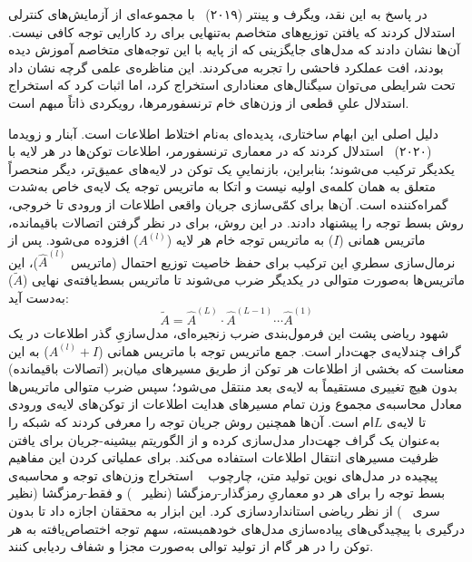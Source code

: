 در پاسخ به این نقد، ویگرف و پینتر (۲۰۱۹)~\cite{wiegreffe2019attention} با مجموعه‌ای از آزمایش‌های کنترلی استدلال کردند که یافتن توزیع‌های متخاصم به‌تنهایی برای رد کارایی توجه کافی نیست. آن‌ها نشان دادند که مدل‌های جایگزینی که از پایه با این توجه‌های متخاصم آموزش دیده بودند، افت عملکرد فاحشی را تجربه می‌کردند. این مناظره‌ی علمی گرچه نشان داد تحت شرایطی می‌توان سیگنال‌های معناداری استخراج کرد، اما اثبات کرد که استخراج استدلال علیِ قطعی از وزن‌های خام ترنسفورمرها، رویکردی ذاتاً مبهم است.

دلیل اصلی این ابهام ساختاری، پدیده‌ای به‌نام اختلاط اطلاعات است. آبنار و زویدما (۲۰۲۰)~\cite{abnar2020quantifying} استدلال کردند که در معماری ترنسفورمر، اطلاعات توکن‌ها در هر لایه با یکدیگر ترکیب می‌شوند؛ بنابراین، بازنماییِ یک توکن در لایه‌های عمیق‌تر، دیگر منحصراً متعلق به همان کلمه‌ی اولیه نیست و اتکا به ماتریس توجه یک لایه‌ی خاص به‌شدت گمراه‌کننده است. آن‌ها برای کمّی‌سازی جریان واقعی اطلاعات از ورودی تا خروجی، روش بسط توجه را پیشنهاد دادند. در این روش، برای در نظر گرفتن اتصالات باقیمانده، ماتریس همانی ($I$) به ماتریس توجه خام هر لایه ($A^{(l)}$) افزوده می‌شود. پس از نرمال‌سازی سطریِ این ترکیب برای حفظ خاصیت توزیع احتمال (ماتریس $\hat{A}^{(l)}$)، این ماتریس‌ها به‌صورت متوالی در یکدیگر ضرب می‌شوند تا ماتریس بسط‌یافته‌ی نهایی ($\tilde{A}$) به‌دست آید:
\begin{equation}\label{eq:chap3_attention_rollout}
    \tilde{A} = \hat{A}^{(L)} \cdot \hat{A}^{(L-1)} \cdots \hat{A}^{(1)}
\end{equation}
شهود ریاضی پشت این فرمول‌بندی ضرب زنجیره‌ای، مدل‌سازیِ گذر اطلاعات در یک گراف چندلایه‌ی جهت‌دار است. جمع ماتریس توجه با ماتریس همانی ($A^{(l)} + I$) به این معناست که بخشی از اطلاعات هر توکن از طریق مسیرهای میان‌بر (اتصالات باقیمانده) بدون هیچ تغییری مستقیماً به لایه‌ی بعد منتقل می‌شود؛ سپس ضرب متوالی ماتریس‌ها معادل محاسبه‌ی مجموع وزن تمام مسیرهای هدایت اطلاعات از توکن‌های لایه‌ی ورودی تا لایه‌ی $L$ام است. آن‌ها همچنین روش جریان توجه را معرفی کردند که شبکه را به‌عنوان یک گراف جهت‌دار مدل‌سازی کرده و از الگوریتم بیشینه-جریان برای یافتن ظرفیت مسیرهای انتقال اطلاعات استفاده می‌کند. برای عملیاتی کردن این مفاهیم پیچیده در مدل‌های نوین تولید متن، چارچوب ~\cite{sarti2023inseq} استخراج وزن‌های توجه و محاسبه‌ی بسط توجه را برای هر دو معماریِ رمزگذار-رمزگشا (نظیر ~\cite{raffel2020exploring}) و فقط-رمزگشا (نظیر سری ~\cite{brown2020language}) از نظر ریاضی استانداردسازی کرد. این ابزار به محققان اجازه داد تا بدون درگیری با پیچیدگی‌های پیاده‌سازی مدل‌های خودهمبسته، سهم توجه اختصاص‌یافته به هر توکن را در هر گام از تولید توالی به‌صورت مجزا و شفاف ردیابی کنند.

